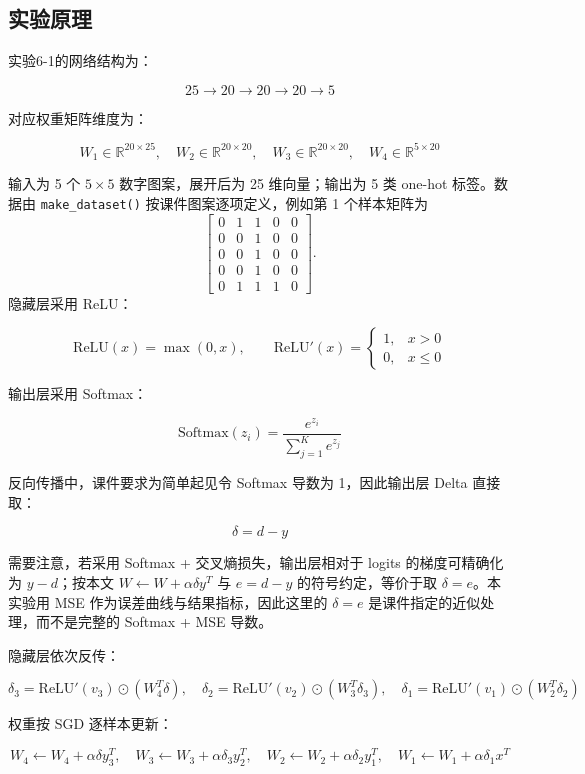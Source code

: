 \documentclass[10.5pt]{config}
\begin{document}
\subsection{实验原理}

实验6-1的网络结构为：

\[
25 \rightarrow 20 \rightarrow 20 \rightarrow 20 \rightarrow 5
\]

对应权重矩阵维度为：

\[
W_1\in\mathbb{R}^{20\times25},\quad
W_2\in\mathbb{R}^{20\times20},\quad
W_3\in\mathbb{R}^{20\times20},\quad
W_4\in\mathbb{R}^{5\times20}
\]

输入为 5 个 $5\times5$ 数字图案，展开后为 25 维向量；输出为 5 类 one-hot 标签。数据由 \texttt{make\_dataset()} 按课件图案逐项定义，例如第 1 个样本矩阵为
\[
\begin{bmatrix}
0&1&1&0&0\\
0&0&1&0&0\\
0&0&1&0&0\\
0&0&1&0&0\\
0&1&1&1&0
\end{bmatrix}.
\]
隐藏层采用 ReLU：

\[
\mathrm{ReLU}(x)=\max(0,x),\qquad
\mathrm{ReLU}'(x)=
\begin{cases}
1, & x>0\\
0, & x\leq0
\end{cases}
\]

输出层采用 Softmax：

\[
\mathrm{Softmax}(z_i)=\frac{e^{z_i}}{\sum_{j=1}^{K}e^{z_j}}
\]

反向传播中，课件要求为简单起见令 Softmax 导数为 1，因此输出层 Delta 直接取：

\[
\delta=d-y
\]

需要注意，若采用 Softmax + 交叉熵损失，输出层相对于 logits 的梯度可精确化为 $y-d$；按本文 $W\leftarrow W+\alpha\delta y^T$ 与 $e=d-y$ 的符号约定，等价于取 $\delta=e$。本实验用 MSE 作为误差曲线与结果指标，因此这里的 $\delta=e$ 是课件指定的近似处理，而不是完整的 Softmax + MSE 导数。

隐藏层依次反传：

\[
\delta_3=\mathrm{ReLU}'(v_3)\odot(W_4^T\delta),\quad
\delta_2=\mathrm{ReLU}'(v_2)\odot(W_3^T\delta_3),\quad
\delta_1=\mathrm{ReLU}'(v_1)\odot(W_2^T\delta_2)
\]

权重按 SGD 逐样本更新：

\[
W_4\leftarrow W_4+\alpha\delta y_3^T,\quad
W_3\leftarrow W_3+\alpha\delta_3 y_2^T,\quad
W_2\leftarrow W_2+\alpha\delta_2 y_1^T,\quad
W_1\leftarrow W_1+\alpha\delta_1 x^T
\]
\end{document}
